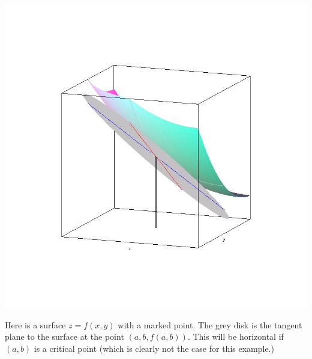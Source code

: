 \documentclass[9pt]{beamer}
\begin{document}
\begin{frame}[t]
{\begin{center}
    \includegraphics[clip,trim=5cm 5cm 5cm 5cm,scale=0.3]{images/tangent_plane.jpg}
   \end{center}
   Here is a surface $z=f(x,y)$ with a marked point.  The grey disk is
   the tangent plane to the surface at the point $(a,b,f(a,b))$.  
   This will be horizontal if $(a,b)$ is a critical point (which is
   clearly not the case for this example.)
  }
\end{frame}
\end{document}
